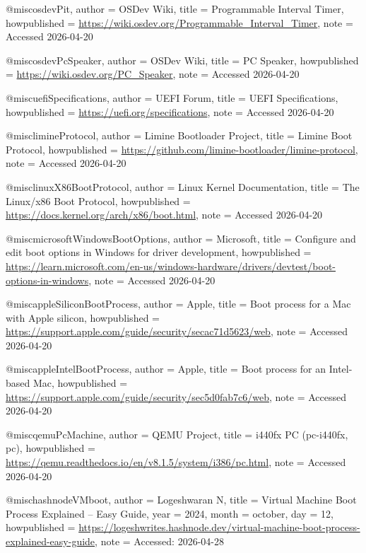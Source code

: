 @misc{osdevPit,
  author       = {{OSDev Wiki}},
  title        = {{Programmable Interval Timer}},
  howpublished = {\url{https://wiki.osdev.org/Programmable_Interval_Timer}},
  note         = {Accessed 2026-04-20}
}

@misc{osdevPcSpeaker,
  author       = {{OSDev Wiki}},
  title        = {{PC Speaker}},
  howpublished = {\url{https://wiki.osdev.org/PC_Speaker}},
  note         = {Accessed 2026-04-20}
}

@misc{uefiSpecifications,
  author       = {{UEFI Forum}},
  title        = {{UEFI Specifications}},
  howpublished = {\url{https://uefi.org/specifications}},
  note         = {Accessed 2026-04-20}
}

@misc{limineProtocol,
  author       = {{Limine Bootloader Project}},
  title        = {{Limine Boot Protocol}},
  howpublished = {\url{https://github.com/limine-bootloader/limine-protocol}},
  note         = {Accessed 2026-04-20}
}

@misc{linuxX86BootProtocol,
  author       = {{Linux Kernel Documentation}},
  title        = {{The Linux/x86 Boot Protocol}},
  howpublished = {\url{https://docs.kernel.org/arch/x86/boot.html}},
  note         = {Accessed 2026-04-20}
}

@misc{microsoftWindowsBootOptions,
  author       = {{Microsoft}},
  title        = {{Configure and edit boot options in Windows for driver development}},
  howpublished = {\url{https://learn.microsoft.com/en-us/windows-hardware/drivers/devtest/boot-options-in-windows}},
  note         = {Accessed 2026-04-20}
}

@misc{appleSiliconBootProcess,
  author       = {{Apple}},
  title        = {{Boot process for a Mac with Apple silicon}},
  howpublished = {\url{https://support.apple.com/guide/security/secac71d5623/web}},
  note         = {Accessed 2026-04-20}
}

@misc{appleIntelBootProcess,
  author       = {{Apple}},
  title        = {{Boot process for an Intel-based Mac}},
  howpublished = {\url{https://support.apple.com/guide/security/sec5d0fab7c6/web}},
  note         = {Accessed 2026-04-20}
}

@misc{qemuPcMachine,
  author       = {{QEMU Project}},
  title        = {{i440fx PC (pc-i440fx, pc)}},
  howpublished = {\url{https://qemu.readthedocs.io/en/v8.1.5/system/i386/pc.html}},
  note         = {Accessed 2026-04-20}
}

@misc{hashnodeVMboot,
  author       = {{Logeshwaran N}},
  title        = {{Virtual Machine Boot Process Explained – Easy Guide}},
  year         = {2024},
  month        = {october},
  day          = {12},
  howpublished = {\url{https://logeshwrites.hashnode.dev/virtual-machine-boot-process-explained-easy-guide}},
  note         = {Accessed: 2026-04-28}
}